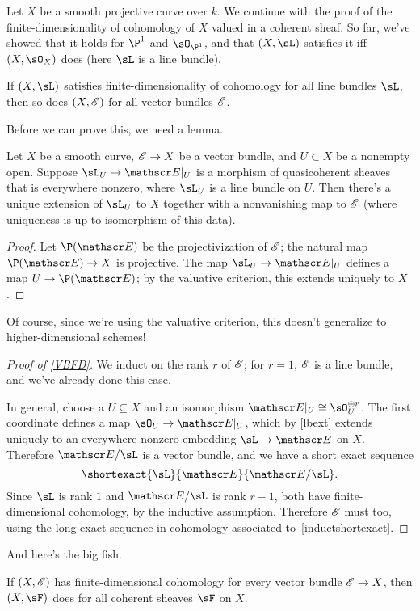 Let $X$ be a smooth projective curve over $k$. We continue with the proof of the finite-dimensionality of cohomology of $X$ valued in a coherent sheaf. So far, we've showed that it holds for $\P^1$ and $\sO_{\P^1}$, and that $(X,\sL)$ satisfies it iff $(X,\sO_X)$ does (here $\sL$ is a line bundle).
\begin{prop}
\label{VBFD}
If $(X,\sL)$ satisfies finite-dimensionality of cohomology for all line bundles $\sL$, then so does $(X,\mathscr E)$ for all vector bundles $\mathscr E$.
\end{prop}
Before we can prove this, we need a lemma.
\begin{lem}
\label{lbext}
Let $X$ be a smooth curve, $\mathscr E\to X$ be a vector bundle, and $U\subset X$ be a nonempty open. Suppose $\sL_U\to\sE|_U$ is a morphism of quasicoherent sheaves that is everywhere nonzero, where $\sL_U$ is a line bundle on $U$. Then there's a unique extension of $\sL_U$ to $X$ together with a nonvanishing map to $\mathscr E$ (where uniqueness is up to isomorphism of this data).
\end{lem}
\begin{proof}
Let $\P(\sE)$ be the projectivization of $\mathscr E$; the natural map $\P(\sE)\to X$ is projective. The map $\sL_U\to \sE|_U$ defines a map $U\to\P(\sE)$; by the valuative criterion, this extends uniquely to $X$.
\end{proof}
Of course, since we're using the valuative criterion, this doesn't generalize to higher-dimensional schemes!
\begin{proof}[Proof of \cref{VBFD}]
We induct on the rank $r$ of $\mathscr E$; for $r = 1$, $\mathscr E$ is a line bundle, and we've already done this case.

In general, choose a $U\subseteq X$ and an isomorphism $\sE|_U\cong\sO_U^{\oplus r}$. The first coordinate defines a map $\sO_U\to\sE|_U$, which by \cref{lbext} extends uniquely to an everywhere nonzero embedding $\sL\to\sE$ on $X$. Therefore $\sE/\sL$ is a vector bundle, and we have a short exact sequence
\begin{equation}
\label{inductshortexact}
\shortexact{\sL}{\sE}{\sE/\sL}.
\end{equation}
Since $\sL$ is rank $1$ and $\sE/\sL$ is rank $r-1$, both have finite-dimensional cohomology, by the inductive assumption. Therefore $\mathscr E$ must too, using the long exact sequence in cohomology associated to~\eqref{inductshortexact}.
\end{proof}
And here's the big fish.
\begin{cor}
If $(X,\mathscr E)$ has finite-dimensional cohomology for every vector bundle $\mathscr E\to X$, then $(X,\sF)$ does for all coherent sheaves $\sF$ on $X$.
\end{cor}
